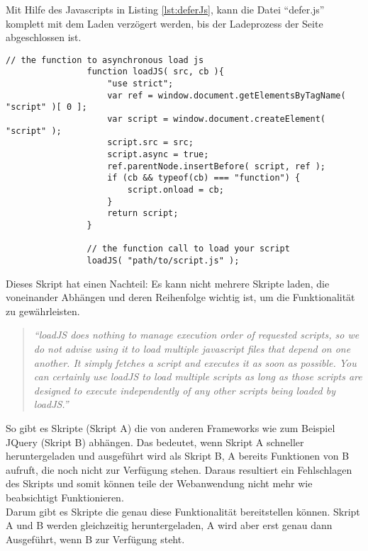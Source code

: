 				Mit Hilfe des Javascripts in Listing \ref{lst:deferJs}, kann die Datei "`defer.js"' komplett mit dem Laden verzögert werden, bis der Ladeprozess der Seite abgeschlossen ist.\\
		
				\begin{lstlisting}[captionpos=b, caption=Javascript nach \autocite{deferJS}, label=lst:deferJs]
				// the function to asynchronous load js
				function loadJS( src, cb ){
					"use strict";
					var ref = window.document.getElementsByTagName( "script" )[ 0 ];
					var script = window.document.createElement( "script" );
					script.src = src;
					script.async = true;
					ref.parentNode.insertBefore( script, ref );
					if (cb && typeof(cb) === "function") {
						script.onload = cb;
					}
					return script;
				}

				// the function call to load your script
				loadJS( "path/to/script.js" );
				\end{lstlisting}

				Dieses Skript hat einen Nachteil: Es kann nicht mehrere Skripte laden, die voneinander Abhängen und deren Reihenfolge wichtig ist, um die Funktionalität zu gewährleisten. 

				\begin{quote}
					\textit{"`loadJS does nothing to manage execution order of requested scripts, so we do not advise using it to load multiple javascript files that depend on one another. It simply fetches a script and executes it as soon as possible. You can certainly use loadJS to load multiple scripts as long as those scripts are designed to execute independently of any other scripts being loaded by loadJS."'\autocite{deferJS}}
				\end{quote}

				So gibt es Skripte (Skript A) die von anderen Frameworks wie zum Beispiel JQuery (Skript B) abhängen. Das bedeutet, wenn Skript A schneller heruntergeladen und ausgeführt wird als Skript B, A bereits Funktionen von B aufruft, die noch nicht zur Verfügung stehen. Daraus resultiert ein Fehlschlagen des Skripts und somit können teile der Webanwendung nicht mehr wie beabsichtigt Funktionieren.\\

				Darum gibt es Skripte die genau diese Funktionalität bereitstellen können. Skript A und B werden gleichzeitig heruntergeladen, A wird aber erst genau dann Ausgeführt, wenn B zur Verfügung steht.\\

